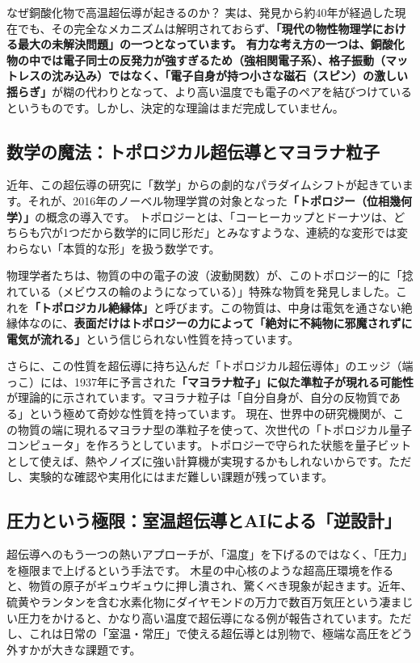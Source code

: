 なぜ銅酸化物で高温超伝導が起きるのか？ 実は、発見から約40年が経過した現在でも、その完全なメカニズムは解明されておらず、\textbf{「現代の物性物理学における最大の未解決問題」の一つとなっています。 有力な考え方の一つは、銅酸化物の中では電子同士の反発力が強すぎるため（強相関電子系）、格子振動（マットレスの沈み込み）ではなく、「電子自身が持つ小さな磁石（スピン）の激しい揺らぎ」}が糊の代わりとなって、より高い温度でも電子のペアを結びつけているというものです。しかし、決定的な理論はまだ完成していません。

\subsection{数学の魔法：トポロジカル超伝導とマヨラナ粒子}

近年、この超伝導の研究に「数学」からの劇的なパラダイムシフトが起きています。それが、2016年のノーベル物理学賞の対象となった\textbf{「トポロジー（位相幾何学）」}の概念の導入です。 トポロジーとは、「コーヒーカップとドーナツは、どちらも穴が1つだから数学的に同じ形だ」とみなすような、連続的な変形では変わらない「本質的な形」を扱う数学です。

物理学者たちは、物質の中の電子の波（波動関数）が、このトポロジー的に「捻れている（メビウスの輪のようになっている）」特殊な物質を発見しました。これを\textbf{「トポロジカル絶縁体」}と呼びます。この物質は、中身は電気を通さない絶縁体なのに、\textbf{表面だけはトポロジーの力によって「絶対に不純物に邪魔されずに電気が流れる」}という信じられない性質を持っています。

さらに、この性質を超伝導に持ち込んだ「トポロジカル超伝導体」のエッジ（端っこ）には、1937年に予言された\textbf{「マヨラナ粒子」に似た準粒子が現れる可能性}が理論的に示されています。マヨラナ粒子は「自分自身が、自分の反物質である」という極めて奇妙な性質を持っています。 現在、世界中の研究機関が、この物質の端に現れるマヨラナ型の準粒子を使って、次世代の「トポロジカル量子コンピュータ」を作ろうとしています。トポロジーで守られた状態を量子ビットとして使えば、熱やノイズに強い計算機が実現するかもしれないからです。ただし、実験的な確認や実用化にはまだ難しい課題が残っています。

\subsection{圧力という極限：室温超伝導とAIによる「逆設計」}

超伝導へのもう一つの熱いアプローチが、「温度」を下げるのではなく、「圧力」を極限まで上げるという手法です。 木星の中心核のような超高圧環境を作ると、物質の原子がギュウギュウに押し潰され、驚くべき現象が起きます。近年、硫黄やランタンを含む水素化物にダイヤモンドの万力で数百万気圧という凄まじい圧力をかけると、かなり高い温度で超伝導になる例が報告されています。ただし、これは日常の「室温・常圧」で使える超伝導とは別物で、極端な高圧をどう外すかが大きな課題です。

